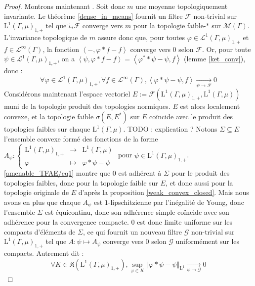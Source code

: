 \documentclass[a4paper,12pt]{article}
\newcommand{\norm}[1]{\left\Vert #1\right\Vert}
\newcommand{\ket}[1]{\left\langle #1 \right\rangle}
\newcommand\fundef[3]{#1: \left\{\begin{array}{ccc}#2\\#3\end{array}\right.}
\renewcommand{\implies}{\Rightarrow}
\newcommand{\blank}{{-}}
\newcommand{\TODO}[1]{{\color{red}TODO :} #1}
\begin{document}
\begin{proof}
    Montrons maintenant \framebox{$(\ref{amenable_TFAE/topological_mean})\implies(\ref{amenable_TFAE/strong_Reiter})$}. Soit donc $m$ une moyenne topologiquement invariante.
    Le théorème \ref{dense_in_means} fournit un filtre $\mathscr{F}$ non-trivial sur $\mathrm{L}^1(\Gamma, \mu)_{1, +}$
    tel que $\widetilde{\iota}_*\mathscr{F}$ converge vers $m$ pour la topologie faible-$*$ sur $\mathcal{M}(\Gamma)$.
    L'invariance topologique de $m$ assure donc que, pour toutes $\varphi\in\mathscr{L}^1(\Gamma, \mu)_{1, +}$ et 
    $f\in\mathscr{L}^\infty(\Gamma)$, la fonction $\ket{\blank, \varphi\ast f - f}$ converge vers $0$ selon $\mathscr{F}$.
    Or, pour toute $\psi\in\mathscr{L}^1(\Gamma, \mu)_{1, +}$, on a $\ket{\psi, \varphi\ast f - f} = \ket{\varphi^*\ast\psi - \psi, f}$ (lemme \ref{ket_conv}),
    donc :
    \begin{equation}\label{amenable_TFAE/eq1}
        \forall\varphi\in\mathscr{L}^1(\Gamma, \mu)_{1, +}, \forall f\in\mathscr{L}^\infty(\Gamma), \ket{\varphi\ast\psi - \psi, f}\xrightarrow[\psi\to\mathscr{F}]{}0
    \end{equation}
    Considérons maintenant l'espace vectoriel $E := \mathcal{F}(\mathrm{L}^1(\Gamma, \mu)_{1, +}, \mathrm{L}^1(\Gamma, \mu))$ muni de la topologie 
    produit des topologies normiques. $E$ est alors localement convexe, et la topologie faible $\sigma(E, E^*)$ sur $E$
    coïncide avec le produit des topologies faibles sur chaque $\mathrm{L}^1(\Gamma, \mu)$. \TODO{explication ?} Notons $\Sigma\subseteq E$ l'ensemble convexe formé
    des fonctions de la forme $\fundef{A_\psi}{\mathrm{L}^1(\Gamma, \mu)_{1, +}&\to&\mathrm{L}^1(\Gamma, \mu)}{\varphi&\mapsto&\varphi\ast\psi - \psi}$ pour $\psi\in\mathrm{L}^1(\Gamma, \mu)_{1, +}$.
    \eqref{amenable_TFAE/eq1} montre que $0$ est adhérent à $\Sigma$ pour le produit des topologies faibles, 
    donc pour la topologie faible sur $E$, et donc aussi pour la topologie originale de $E$ d'après la proposition \ref{weak_convex_closed}.
    Mais nous avons en plus que chaque $A_\psi$ est $1$-lipschitzienne par l'inégalité de Young, donc l'ensemble
    $\Sigma$ est équicontinu, donc son adhérence simple coïncide avec son adhérence pour la convergence compacte.
    $0$ est donc limite uniforme sur les compacts d'éléments de $\Sigma$, ce qui fournit un nouveau filtre $\mathscr{G}$ non-trivial sur $\mathrm{L}^1(\Gamma, \mu)_{1, +}$ 
    tel que $A:\psi\mapsto A_\psi$ converge vers $0$ selon $\mathscr{G}$ uniformément sur les compacts. Autrement dit :
    \begin{equation}\label{amenable_TFAE/eq2}
        \forall K\in\mathfrak{K}(\mathrm{L}^1(\Gamma, \mu)_{1, +}), \sup_{\varphi\in K}\norm{\varphi\ast\psi - \psi}_{\mathrm{L}^1} \xrightarrow[\psi\to\mathscr{G}]{} 0
    \end{equation}


\end{proof}
\end{document}
